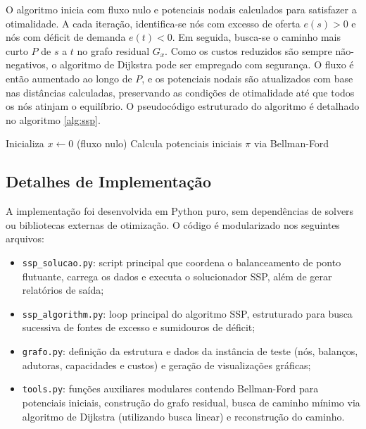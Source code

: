 O algoritmo inicia com fluxo nulo e potenciais nodais calculados para satisfazer a otimalidade. A cada iteração, identifica-se nós com excesso de oferta $e(s) > 0$ e nós com déficit de demanda $e(t) < 0$. Em seguida, busca-se o caminho mais curto $P$ de $s$ a $t$ no grafo residual $G_x$. Como os custos reduzidos são sempre não-negativos, o algoritmo de Dijkstra pode ser empregado com segurança. O fluxo é então aumentado ao longo de $P$, e os potenciais nodais são atualizados com base nas distâncias calculadas, preservando as condições de otimalidade até que todos os nós atinjam o equilíbrio. O pseudocódigo estruturado do algoritmo é detalhado no algoritmo \ref{alg:ssp}.

\begin{algorithm}[H]
  \caption{Successive Shortest Path}
  \label{alg:ssp}
  \SetAlgoLined
  Inicializa $x \leftarrow 0$ (fluxo nulo)\;
  Calcula potenciais iniciais $\pi$ via Bellman-Ford\;
  \;
\end{algorithm}


\subsection{Detalhes de Implementação}

A implementação foi desenvolvida em Python puro, sem dependências de solvers ou bibliotecas externas de otimização. O código é modularizado nos seguintes arquivos:

\begin{itemize}
  \item \texttt{ssp\_solucao.py}: script principal que coordena o balanceamento de ponto flutuante, carrega os dados e executa o solucionador SSP, além de gerar relatórios de saída;
  \item \texttt{ssp\_algorithm.py}: loop principal do algoritmo SSP, estruturado para busca sucessiva de fontes de excesso e sumidouros de déficit;
  \item \texttt{grafo.py}: definição da estrutura e dados da instância de teste (nós, balanços, adutoras, capacidades e custos) e geração de visualizações gráficas;
  \item \texttt{tools.py}: funções auxiliares modulares contendo Bellman-Ford para potenciais iniciais, construção do grafo residual, busca de caminho mínimo via algoritmo de Dijkstra (utilizando busca linear) e reconstrução do caminho.
\end{itemize}

